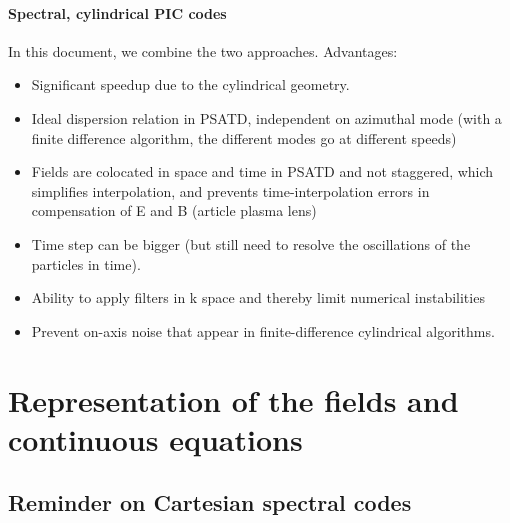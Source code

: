 \documentclass[a4paper]{article}   	%
\begin{document}
\paragraph{Spectral, cylindrical PIC codes } In this document, we combine the two approaches. Advantages:
\begin{itemize}
\item Significant speedup due to the cylindrical geometry.
\item Ideal dispersion relation in PSATD, independent on azimuthal mode (with a finite difference algorithm, the different modes go at different speeds)
\item Fields are colocated in space and time in PSATD and not
  staggered, which simplifies interpolation, and prevents
  time-interpolation errors in compensation of E and B (article plasma
  lens)
\item Time step can be bigger (but still need to resolve the
  oscillations of the particles in time).
\item Ability to apply filters in k space and thereby limit numerical instabilities
\item Prevent on-axis noise that appear in finite-difference cylindrical algorithms.
\end{itemize}


\section{Representation of the fields and continuous equations}

\subsection{Reminder on Cartesian spectral codes}
\end{document}

